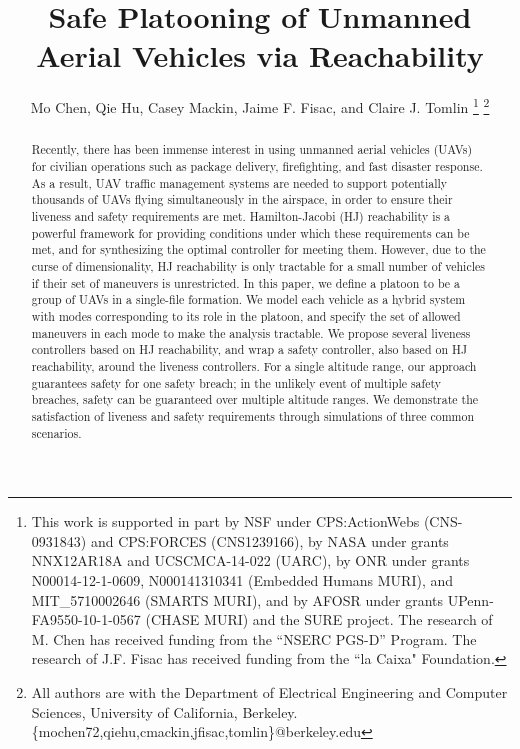 \documentclass[letterpaper, 10pt, conference]{ieeeconf}      %
\title{\LARGE \bf
Safe Platooning of Unmanned Aerial Vehicles via Reachability}
\author{Mo Chen, Qie Hu, Casey Mackin, Jaime F. Fisac, and Claire J. Tomlin
\thanks{This work is supported in part by NSF under CPS:ActionWebs (CNS-0931843) and CPS:FORCES (CNS1239166), by NASA under grants NNX12AR18A and UCSCMCA-14-022 (UARC), by ONR under grants N00014-12-1-0609, N000141310341 (Embedded Humans MURI), and MIT\_5710002646 (SMARTS MURI), and by AFOSR under grants UPenn-FA9550-10-1-0567 (CHASE MURI) and the SURE project. The research of M. Chen has received funding from the ``NSERC PGS-D'' Program. The research of J.F. Fisac has received funding from the ``la Caixa" Foundation.}
\thanks{All authors are with the Department of Electrical Engineering and Computer Sciences, University of California, Berkeley. \{mochen72,qiehu,cmackin,jfisac,tomlin\}@berkeley.edu}
}
\begin{document}
\maketitle
\thispagestyle{empty}
\pagestyle{empty}

\begin{abstract}
Recently, there has been immense interest in using unmanned aerial vehicles (UAVs) for civilian operations such as package delivery, firefighting, and fast disaster response. As a result, UAV traffic management systems are needed to support potentially thousands of UAVs flying simultaneously in the airspace, in order to ensure their liveness and safety requirements are met. Hamilton-Jacobi (HJ) reachability is a powerful framework for providing conditions under which these requirements can be met, and for synthesizing the optimal controller for meeting them. However, due to the curse of dimensionality, HJ reachability is only tractable for a small number of vehicles if their set of maneuvers is unrestricted. In this paper, we define a platoon to be a group of UAVs in a single-file formation. We model each vehicle as a hybrid system with modes corresponding to its role in the platoon, and specify the set of allowed maneuvers in each mode to make the analysis tractable. We propose several liveness controllers based on HJ reachability, and wrap a safety controller, also based on HJ reachability, around the liveness controllers. For a single altitude range, our approach guarantees safety for one safety breach; in the unlikely event of multiple safety breaches, safety can be guaranteed over multiple altitude ranges. We demonstrate the satisfaction of liveness and safety requirements through simulations of three common scenarios.
\end{abstract}







% 


\end{document}
